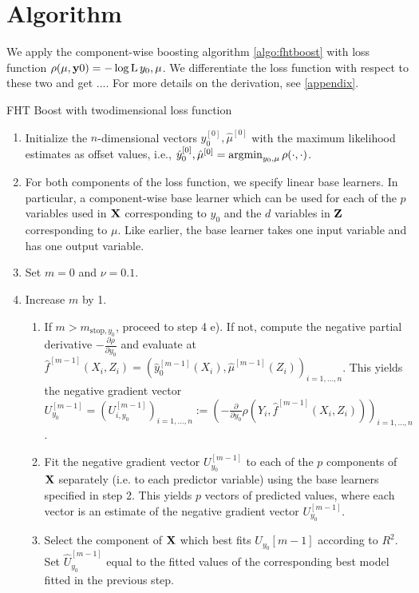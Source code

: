 \section{Algorithm}
We apply the component-wise boosting algorithm \ref{algo:fhtboost} with loss function $\rho(\mu,\mathbf{y}0)=-\log\operatorname{L}{y_0,\mu}$. We differentiate the loss function with respect to these two and get .... For more details on the derivation, see \ref{appendix}. 

\begin{algorithm}
\caption{FHT Boost with twodimensional loss function}
\label{algo:fhtboost}
\begin{enumerate}
    \item Initialize the $n$-dimensional vectors $\hat{y}_0^{[0]},\hat{\mu}^{[0]}$ with the maximum likelihood estimates as offset values, i.e., $\hat{y}_0^{[0]}, \hat{\mu}^{[0]}=\operatorname*{argmin}_{y_0,\mu}\rho(\cdot,\cdot)$.
    \item For both components of the loss function, we specify linear base learners. In particular, a component-wise base learner which can be used for each of the $p$ variables used in $\mathbf{X}$ corresponding to $y_0$ and the $d$ variables in $\mathbf{Z}$ corresponding to $\mu$. Like earlier, the base learner takes one input variable and has one output variable.
    \item Set $m=0$ and $\nu=0.1$.
    \item Increase $m$ by 1.
    \begin{enumerate}
        \item If $m>m_{\text{stop},y_0}$, proceed to step 4 e). If not, compute the negative partial derivative $-\frac{\partial\rho}{\partial y_0}$ and evaluate at $\hat{f}^{[m-1]}(X_i,Z_i)=\left(\hat{y}_0^{[m-1]}(X_i),\hat{\mu}^{[m-1]}(Z_i)\right)_{i=1,\ldots,n}$. This yields the negative gradient vector $U_{y_0}^{[m-1]}=\left(U_{i,y_0}^{[m-1]}\right)_{i=1,\ldots,n}:=\left(-\frac{\partial}{\partial y_0}\rho\left(Y_i,\hat{f}^{[m-1]}(X_i,Z_i)\right)\right)_{i=1,\ldots,n}$.
        \item Fit the negative gradient vector $U_{y_0}^{[m-1]}$ to each of the $p$ components of $\mathbf{X}$ separately (i.e. to each predictor variable) using the base learners specified in step 2. This yields $p$ vectors of predicted values, where each vector is an estimate of the negative gradient vector $U_{y_0}^{[m-1]}$.
        \item Select the component of $\mathbf{X}$ which best fits $U_{y_0}{[m-1]}$ according to $R^2$. Set $\hat{U}_{y_0}^{[m-1]}$ equal to the fitted values of the corresponding best model fitted in the previous step.

\end{enumerate}
\end{enumerate}
\end{algorithm}
